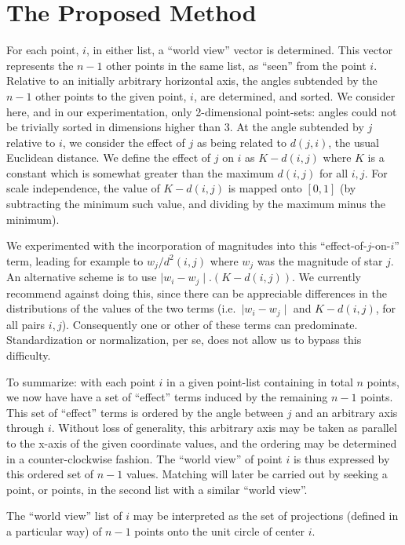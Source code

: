 \section{The Proposed Method}

For each point, $i$,  in either list, a ``world view'' vector is determined.
This vector represents the $n-1$ other points in the same
list, as ``seen'' from the point $i$.  Relative to an initially arbitrary
horizontal axis, the angles subtended by the $n-1$ other points to the
given point, $i$, are determined, and sorted.  We consider here, and in
our experimentation, only 2-dimensional point-sets: angles could not be
trivially sorted in dimensions higher than 3. At the angle subtended by
$j$ relative to $i$, we consider the effect of $j$ as being related to
$d(j,i)$, the usual Euclidean distance.  
We define the effect of $j$ on $i$ as
$K - d(i,j)$ where $K$ is a constant which is somewhat greater than
the maximum $d(i,j)$ for all $i,j$.  For scale independence, the value
of $K - d(i,j)$ is mapped onto $[0, 1]$ (by subtracting the minimum such 
value, and dividing by the maximum minus the minimum).

We experimented with the incorporation of 
magnitudes into this ``effect-of-$j$-on-$i$'' term, 
leading for example to $w_j/d^2(i,j)$ where
$w_j$ was the magnitude of star $j$.  An alternative scheme is to use
$\mid w_i - w_j \mid . (K - d(i,j))$.  We  currently recommend against doing
this, since there can be appreciable differences in the 
distributions of the values of the two terms (i.e.\ 
$\mid w_i - w_j \mid$ and $K - d(i,j)$, for all pairs $i, j$).
Consequently one or other
of these terms can predominate.  Standardization or normalization, per se, does
not allow us to bypass this difficulty.

To summarize: with each point $i$ in a given point-list containing in total
$n$ points, we now have have a set of ``effect'' terms induced by the 
remaining $n-1$ points.  This set of ``effect'' terms is 
ordered by the angle between  $j$ and an arbitrary axis through $i$.  Without
loss of generality, this arbitrary axis may be taken as parallel to the
x-axis of the given coordinate values, and the ordering may be determined
in a counter-clockwise fashion.  The ``world view'' of point $i$ is thus
expressed by this ordered set of $n-1$ values.  Matching will later be
carried out by seeking a point, or points, in the second list with a similar
``world view''.

The ``world view'' list of $i$ may be interpreted as the set of projections
(defined in a particular way) of $n-1$ points onto the unit circle of center
$i$.

